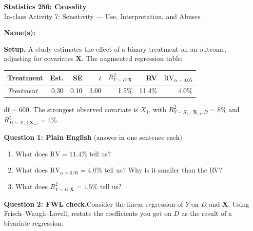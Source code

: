 \documentclass[11pt]{article}
\begin{document}
\begin{center}
{\Large \textbf{Statistics 256: Causality}} \\[6pt]
{\large In-class Activity 7: Sensitivity --- Use, Interpretation, and Abuses}
\end{center}

\vspace{4pt}
\noindent\textbf{Name(s):} \hrulefill

\vspace{12pt}

\noindent\textbf{Setup.}  A study estimates the effect of a binary treatment on an outcome, adjusting for covariates $\mathbf{X}$.  The augmented regression table:

\medskip
\begin{center}
\begin{tabular}{lrrrrrr}
\toprule
Treatment & Est. & SE & $t$ & $R^2_{Y\sim D|\mathbf{X}}$ & RV & $\mathrm{RV}_{\alpha=0.05}$ \\
\midrule
\textit{Treatment} & 0.30 & 0.10 & 3.00 & 1.5\% & 11.4\% & 4.0\% \\
\bottomrule
\end{tabular}
\end{center}
\medskip
\noindent $\mathrm{df} = 600$.  The strongest observed covariate is $X_1$, with $R^2_{Y\sim X_1 \mid \mathbf{X}_{-1},D} = 8\%$ and $R^2_{D \sim X_1 \mid \mathbf{X}_{-1}} = 4\%$.

\vspace{14pt}

\noindent\textbf{Question 1: Plain English} (answer in one sentence each)
\medskip
\begin{enumerate}[label=(\alph*)]
\item What does $\mathrm{RV} = 11.4\%$ tell us?
\vspace{1.2cm}

\item What does $\mathrm{RV}_{\alpha=0.05} = 4.0\%$ tell us?  Why is it smaller than the RV?
\vspace{1.4cm}

\item What does $R^2_{Y\sim D|\mathbf{X}} = 1.5\%$ tell us?
\vspace{1.2cm}
\end{enumerate}


\noindent\textbf{Question 2: FWL check}.Consider the linear regression of $Y$ on $D$ and $\mathbf{X}$. Using Frisch--Waugh--Lovell, restate the coefficients you get on $D$ as the result of a bivariate regression. 
\vspace{2.5cm}
\end{document}
